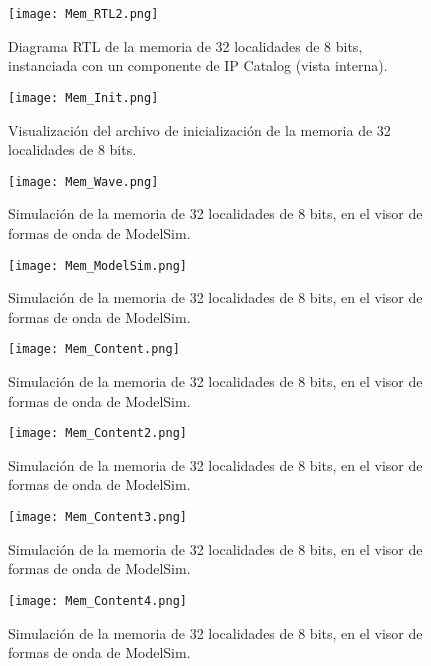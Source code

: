 \begin{figure}[ht]
	\centering
	\texttt{[image: Mem\_RTL2.png]}
	\caption{Diagrama RTL de la memoria de 32 localidades de 8 bits, instanciada con un componente de IP Catalog (vista interna). \label{fig:mem_rtl2}}
\end{figure}

\begin{figure}[ht]
	\centering
	\texttt{[image: Mem\_Init.png]}
	\caption{Visualización del archivo de inicialización de la memoria de 32 localidades de 8 bits. \label{fig:mem_init}}
\end{figure}

\begin{figure}[ht]
	\centering
	\texttt{[image: Mem\_Wave.png]}
	\caption{Simulación de la memoria de 32 localidades de 8 bits, en el visor de formas de onda de ModelSim. \label{fig:mem_wave}}
\end{figure}

\begin{figure}[ht]
	\centering
	\texttt{[image: Mem\_ModelSim.png]}
	\caption{Simulación de la memoria de 32 localidades de 8 bits, en el visor de formas de onda de ModelSim. \label{fig:mem_modelsim}}
\end{figure}

\begin{figure}[ht]
	\centering
	\texttt{[image: Mem\_Content.png]}
	\caption{Simulación de la memoria de 32 localidades de 8 bits, en el visor de formas de onda de ModelSim. \label{fig:mem_content1}}
\end{figure}

\begin{figure}[ht]
	\centering
	\texttt{[image: Mem\_Content2.png]}
	\caption{Simulación de la memoria de 32 localidades de 8 bits, en el visor de formas de onda de ModelSim. \label{fig:mem_content2}}
\end{figure}

\begin{figure}[ht]
	\centering
	\texttt{[image: Mem\_Content3.png]}
	\caption{Simulación de la memoria de 32 localidades de 8 bits, en el visor de formas de onda de ModelSim. \label{fig:mem_content3}}
\end{figure}

\begin{figure}[ht]
	\centering
	\texttt{[image: Mem\_Content4.png]}
	\caption{Simulación de la memoria de 32 localidades de 8 bits, en el visor de formas de onda de ModelSim. \label{fig:mem_content4}}
\end{figure}